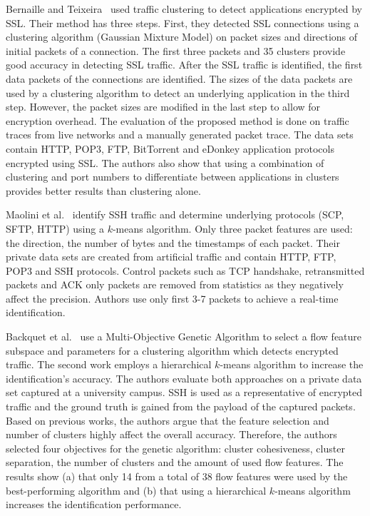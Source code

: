 Bernaille and Teixeira~\cite{Bernaille-2007-Early} used traffic clustering to detect applications encrypted by SSL. Their method has three steps. First, they detected SSL connections using a clustering algorithm (Gaussian Mixture Model) on packet sizes and directions of initial packets of a connection. The first three packets and 35 clusters provide good accuracy in detecting SSL traffic. After the SSL traffic is identified, the first data packets of the connections are identified. The sizes of the data packets are used by a clustering algorithm to detect an underlying application in the third step. However, the packet sizes are modified in the last step to allow for encryption overhead. The evaluation of the proposed method is done on traffic traces from live networks and a manually generated packet trace. The data sets contain HTTP, POP3, FTP, BitTorrent and eDonkey application protocols encrypted using SSL. The authors also show that using a combination of clustering and port numbers to differentiate between applications in clusters provides better results than clustering alone.

Maolini et al.~\cite{Maiolini-2009-Real} identify SSH traffic and determine underlying protocols (SCP, SFTP, HTTP) using a $k$-means algorithm. Only three packet features are used: the direction, the number of bytes and the timestamps of each packet. Their private data sets are created from artificial traffic and contain HTTP, FTP, POP3 and SSH protocols. Control packets such as TCP handshake, retransmitted packets and ACK only packets are removed from statistics as they negatively affect the precision. Authors use only first 3-7 packets to achieve a real-time identification.

Backquet et al.~\cite{Bacquet-2009-Investigation, Bacquet-2011-Genetic} use a Multi-Objective Genetic Algorithm to select a flow feature subspace and parameters for a clustering algorithm which detects encrypted traffic. The second work employs a hierarchical $k$-means algorithm to increase the identification's accuracy. The authors evaluate both approaches on a private data set captured at a university campus. SSH is used as a representative of encrypted traffic and the ground truth is gained from the payload of the captured packets. Based on previous works, the authors argue that the feature selection and number of clusters highly affect the overall accuracy. Therefore, the authors selected four objectives for the genetic algorithm: cluster cohesiveness, cluster separation, the number of clusters and the amount of used flow features. The results show (a) that only 14 from a total of 38 flow features were used by the best-performing algorithm and (b) that using a hierarchical $k$-means algorithm increases the identification performance.


